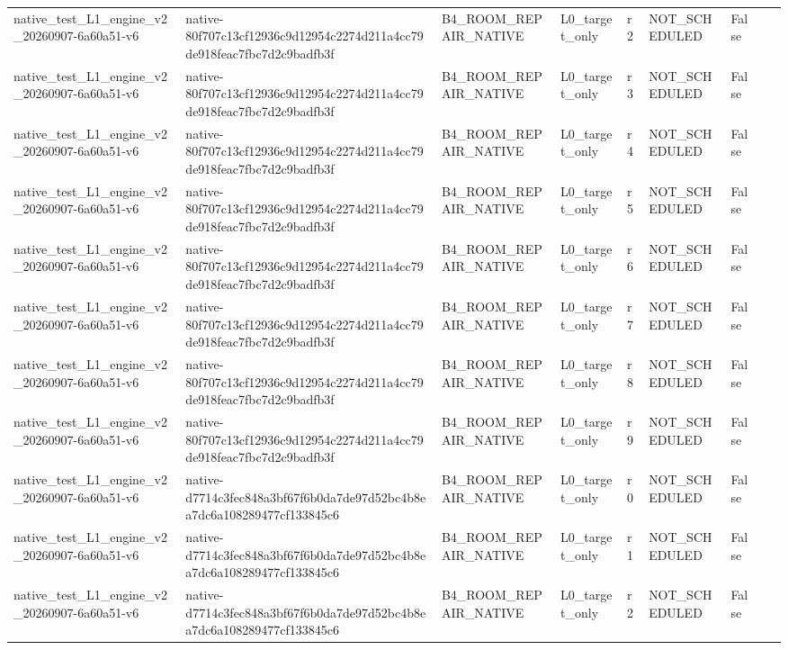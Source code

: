 \begin{tabular}{lllllllll}
native\_test\_L1\_engine\_v2\_20260907-6a60a51-v6 & native-80f707c13cf12936c9d12954c2274d211a4cc79de918feac7fbc7d2c9badfb3f & B4\_ROOM\_REPAIR\_NATIVE & L0\_target\_only & r2 & NOT\_SCHEDULED & False &  &  \\
native\_test\_L1\_engine\_v2\_20260907-6a60a51-v6 & native-80f707c13cf12936c9d12954c2274d211a4cc79de918feac7fbc7d2c9badfb3f & B4\_ROOM\_REPAIR\_NATIVE & L0\_target\_only & r3 & NOT\_SCHEDULED & False &  &  \\
native\_test\_L1\_engine\_v2\_20260907-6a60a51-v6 & native-80f707c13cf12936c9d12954c2274d211a4cc79de918feac7fbc7d2c9badfb3f & B4\_ROOM\_REPAIR\_NATIVE & L0\_target\_only & r4 & NOT\_SCHEDULED & False &  &  \\
native\_test\_L1\_engine\_v2\_20260907-6a60a51-v6 & native-80f707c13cf12936c9d12954c2274d211a4cc79de918feac7fbc7d2c9badfb3f & B4\_ROOM\_REPAIR\_NATIVE & L0\_target\_only & r5 & NOT\_SCHEDULED & False &  &  \\
native\_test\_L1\_engine\_v2\_20260907-6a60a51-v6 & native-80f707c13cf12936c9d12954c2274d211a4cc79de918feac7fbc7d2c9badfb3f & B4\_ROOM\_REPAIR\_NATIVE & L0\_target\_only & r6 & NOT\_SCHEDULED & False &  &  \\
native\_test\_L1\_engine\_v2\_20260907-6a60a51-v6 & native-80f707c13cf12936c9d12954c2274d211a4cc79de918feac7fbc7d2c9badfb3f & B4\_ROOM\_REPAIR\_NATIVE & L0\_target\_only & r7 & NOT\_SCHEDULED & False &  &  \\
native\_test\_L1\_engine\_v2\_20260907-6a60a51-v6 & native-80f707c13cf12936c9d12954c2274d211a4cc79de918feac7fbc7d2c9badfb3f & B4\_ROOM\_REPAIR\_NATIVE & L0\_target\_only & r8 & NOT\_SCHEDULED & False &  &  \\
native\_test\_L1\_engine\_v2\_20260907-6a60a51-v6 & native-80f707c13cf12936c9d12954c2274d211a4cc79de918feac7fbc7d2c9badfb3f & B4\_ROOM\_REPAIR\_NATIVE & L0\_target\_only & r9 & NOT\_SCHEDULED & False &  &  \\
native\_test\_L1\_engine\_v2\_20260907-6a60a51-v6 & native-d7714c3fec848a3bf67f6b0da7de97d52bc4b8ea7dc6a108289477cf133845c6 & B4\_ROOM\_REPAIR\_NATIVE & L0\_target\_only & r0 & NOT\_SCHEDULED & False &  &  \\
native\_test\_L1\_engine\_v2\_20260907-6a60a51-v6 & native-d7714c3fec848a3bf67f6b0da7de97d52bc4b8ea7dc6a108289477cf133845c6 & B4\_ROOM\_REPAIR\_NATIVE & L0\_target\_only & r1 & NOT\_SCHEDULED & False &  &  \\
native\_test\_L1\_engine\_v2\_20260907-6a60a51-v6 & native-d7714c3fec848a3bf67f6b0da7de97d52bc4b8ea7dc6a108289477cf133845c6 & B4\_ROOM\_REPAIR\_NATIVE & L0\_target\_only & r2 & NOT\_SCHEDULED & False &  &  \\

\end{tabular}
